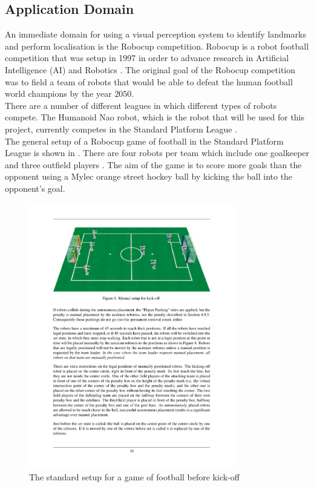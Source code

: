 \documentclass{report}
\begin{document}
\subsection{Application Domain}
\label{sec:domain}
An immediate domain for using a visual perception system to identify landmarks and perform localisation is the Robocup competition. Robocup is a robot football competition that was setup in 1997 in order to advance research in Artificial Intelligence (AI) and Robotics \cite{Robocup}. The original goal of the Robocup competition was to field a team of robots that would be able to defeat the human football world champions by the year $2050$.\\

There are a number of different leagues in which different types of robots compete. The Humanoid Nao robot, which is the robot that will be used for this project, currently competes in the Standard Platform League \cite{StandardPlatform}.\\

The general setup of a Robocup game of football in the Standard Platform League is shown in . There are four robots per team which include one goalkeeper and three outfield players \cite{Rules}. The aim of the game is to score more goals than the opponent using a Mylec orange street hockey ball by kicking the ball into the opponent's goal.\\

\begin{figure}[h!] 
  \centering
    \includegraphics[width=0.8\textwidth]{../Drawings/robocup/NaoField.pdf}
    \caption{The standard setup for a game of football before kick-off \cite{Rules}}
    \label{fig:naofield}
\end{figure}
\end{document}
